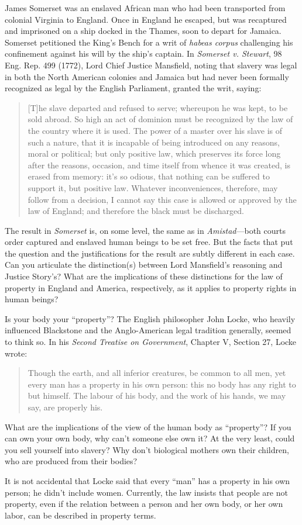 \item James Somerset was an enslaved African man who had been transported from
colonial Virginia to England. Once in England he escaped, but was recaptured
and imprisoned on a ship docked in the Thames, soon to depart for Jamaica.
Somerset petitioned the King's Bench for a writ of \textit{habeas corpus}
challenging his confinement against his will by the ship's captain. In
\textit{Somerset v. Stewart}, 98 Eng. Rep. 499 (1772), Lord Chief Justice
Mansfield, noting that slavery was legal in both the North American colonies
and Jamaica but had never been formally recognized as legal by the English
Parliament, granted the writ, saying:
\begin{quote}
[T]he slave departed and refused to serve; whereupon he was kept, to be sold
abroad. So high an act of dominion must be recognized by the law of the country
where it is used. The power of a master over his slave is of such a nature,
that it is incapable of being introduced on any reasons, moral or political;
but only positive law, which preserves its force long after the reasons,
occasion, and time itself from whence it was created, is erased from memory:
it's so odious, that nothing can be suffered to support it, but positive law.
Whatever inconveniences, therefore, may follow from a decision, I cannot say
this case is allowed or approved by the law of England; and therefore the black
must be discharged.
\end{quote}
The result in \textit{Somerset} is, on some level, the same as in
\textit{Amistad}---both courts order captured and enslaved human beings to be
set free. But the facts that put the question and the justifications for the
result are subtly different in each case. Can you articulate the distinction(s)
between Lord Mansfield's reasoning and Justice Story's? What are the
implications of these distinctions for the law of property in England and
America, respectively, as it applies to property rights in human beings?


\item Is your body your ``property''? The English philosopher John Locke, who
heavily influenced Blackstone and the Anglo-American legal tradition generally,
seemed to think so. In his \textit{Second Treatise on Government}, Chapter V,
Section 27, Locke wrote: 
\begin{quote}
Though the earth, and all inferior creatures, be common to all men, yet
every man has a property in his own person: this no body has any right to but
himself. The labour of his body, and the work of his hands, we may say, are
properly his.
\end{quote}
What are the implications of the view of the human body as ``property''?  If you
can own your own body, why can't someone else own it?  At the very least, could
you sell yourself into slavery?  Why don't biological mothers own their
children, who are produced from their bodies? 

It is not accidental that Locke said that every ``man'' has a property in his
own person; he didn't include women. Currently, the law insists that people are
not property, even if the relation between a person and her own body, or her
own labor, can be described in property terms.

